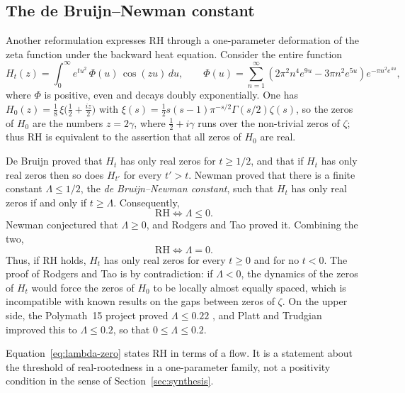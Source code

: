\documentclass[11pt]{amsart}
\theoremstyle{definition}
\theoremstyle{remark}
\begin{document}
\subsection{The de Bruijn--Newman constant}\label{sec:dbn}

Another reformulation expresses RH through a one-parameter deformation of the zeta function under the backward heat equation. Consider the entire function
\begin{equation}\label{eq:Ht}
H_t(z) = \int_0^\infty e^{t u^2}\, \Phi(u)\, \cos(z u)\, du,
\qquad
\Phi(u) = \sum_{n=1}^\infty \left( 2\pi^2 n^4 e^{9u} - 3\pi n^2 e^{5u} \right) e^{-\pi n^2 e^{4u}},
\end{equation}
where $\Phi$ is positive, even and decays doubly exponentially. One has $H_0(z)=\tfrac18\,\xi\bigl(\tfrac12+\tfrac{iz}{2}\bigr)$ with $\xi(s)=\tfrac12s(s-1)\pi^{-s/2}\Gamma(s/2)\zeta(s)$, so the zeros of $H_0$ are the numbers $z=2\gamma$, where $\tfrac12+i\gamma$ runs over the non-trivial zeros of $\zeta$; thus RH is equivalent to the assertion that all zeros of $H_0$ are real.

De Bruijn \cite{debruijn1950} proved that $H_t$ has only real zeros for $t\ge1/2$, and that if $H_t$ has only real zeros then so does $H_{t'}$ for every $t'>t$. Newman \cite{newman1976} proved that there is a finite constant $\Lambda\le1/2$, the \emph{de Bruijn--Newman constant}, such that $H_t$ has only real zeros if and only if $t \ge \Lambda$. Consequently,
\begin{equation}
\text{RH} \iff \Lambda \le 0.
\end{equation}
Newman conjectured that $\Lambda \ge 0$, and Rodgers and Tao \cite{rodgers2020} proved it. Combining the two,
\begin{equation}\label{eq:lambda-zero}
\boxed{\;\text{RH} \iff \Lambda = 0.\;}
\end{equation}
Thus, if RH holds, $H_t$ has only real zeros for every $t\ge0$ and for no $t<0$. The proof of Rodgers and Tao is by contradiction: if $\Lambda<0$, the dynamics of the zeros of $H_t$ would force the zeros of $H_0$ to be locally almost equally spaced, which is incompatible with known results on the gaps between zeros of $\zeta$. On the upper side, the Polymath~15 project proved $\Lambda\le0.22$ \cite{polymath2019}, and Platt and Trudgian \cite{platt2021} improved this to $\Lambda\le 0.2$, so that $0\le\Lambda\le0.2$.

Equation~\eqref{eq:lambda-zero} states RH in terms of a flow. It is a statement about the threshold of real-rootedness in a one-parameter family, not a positivity condition in the sense of Section~\ref{sec:synthesis}.
\end{document}
